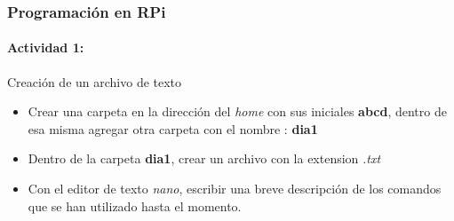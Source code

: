 \documentclass{beamer}
\begin{document}
	\begin{frame}
		\frametitle{Programación en RPi}
		\framesubtitle{Actividad 1:}
		\begin{mybox}{Creación de un archivo de texto}
			\begin{itemize}
				\item Crear una carpeta en la dirección del \textit{home} con sus iniciales \textbf{abcd}, dentro de esa misma agregar otra carpeta con el nombre : \textbf{dia1}
				\item Dentro de la carpeta \textbf{dia1}, crear un archivo con la extension \textit{.txt}
				\item Con el editor de texto \textit{nano}, escribir una breve descripción de los comandos que se han utilizado hasta el momento.
			\end{itemize}
			
		\end{mybox}
	\end{frame}
\end{document}
